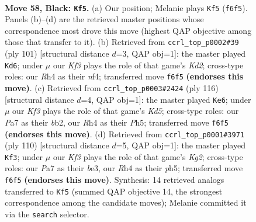 \documentclass[11pt]{article}
\begin{document}
\clearpage

\begin{figure}[p]\centering
\begin{subfigure}{0.46\textwidth}\centering
\resizebox{\linewidth}{!}{%
\newchessgame
\chessboard[
  setfen={8/p2p4/2p2k2/8/7r/8/4K3/8 b - - 3 58},
  showmover=false,
  pgfstyle=straightmove, color=movearrow, markmove={f6-f5}
]}
\caption{}
\end{subfigure}\hfill
\begin{subfigure}{0.46\textwidth}\centering
\resizebox{\linewidth}{!}{%
\newchessgame
\chessboard[
  setfen={8/3k4/5p2/1p6/p2K1N2/8/8/8 b - - 1 51},
  showmover=false,
  pgfstyle=straightmove, color=movearrow, markmove={d7-d6}
]}
\caption{}
\end{subfigure}
\\[4pt]
\begin{subfigure}{0.46\textwidth}\centering
\resizebox{\linewidth}{!}{%
\newchessgame
\chessboard[
  setfen={4k3/8/8/3K2PP/5P2/8/1b6/8 w - - 3 59},
  showmover=false,
  pgfstyle=straightmove, color=movearrow, markmove={d5-e6}
]}
\caption{}
\end{subfigure}\hfill
\begin{subfigure}{0.46\textwidth}\centering
\resizebox{\linewidth}{!}{%
\newchessgame
\chessboard[
  setfen={8/8/8/1P2k2p/P7/4b3/6K1/8 w - - 0 56},
  showmover=false,
  pgfstyle=straightmove, color=movearrow, markmove={g2-f3}
]}
\caption{}
\end{subfigure}
\caption{\textbf{Move 58, Black: \texttt{Kf5}.} (a) Our position; Melanie plays \texttt{Kf5} (\texttt{f6f5}). Panels (b)--(d) are the retrieved master positions whose correspondence most drove this move (highest QAP objective among those that transfer to it). (b) Retrieved from \texttt{ccrl\_top\_p0002\#39} (ply 101) [structural distance $d$=3, QAP obj=1]: the master played \texttt{Kd6}; under $\mu$ our \emph{Kf3} plays the role of that game's \emph{Kd2}; cross-type roles: our \emph{R}h4 as their \emph{n}f4; transferred move \texttt{f6f5} \textbf{(endorses this move)}. (c) Retrieved from \texttt{ccrl\_top\_p0003\#2424} (ply 116) [structural distance $d$=4, QAP obj=1]: the master played \texttt{Ke6}; under $\mu$ our \emph{Kf3} plays the role of that game's \emph{Kd5}; cross-type roles: our \emph{P}a7 as their \emph{b}b2, our \emph{R}h4 as their \emph{P}h5; transferred move \texttt{f6f5} \textbf{(endorses this move)}. (d) Retrieved from \texttt{ccrl\_top\_p0001\#3971} (ply 110) [structural distance $d$=5, QAP obj=1]: the master played \texttt{Kf3}; under $\mu$ our \emph{Kf3} plays the role of that game's \emph{Kg2}; cross-type roles: our \emph{P}a7 as their \emph{b}e3, our \emph{R}h4 as their \emph{p}h5; transferred move \texttt{f6f5} \textbf{(endorses this move)}. Synthesis: 14 retrieved analogs transferred to \texttt{Kf5} (summed QAP objective 14, the strongest correspondence among the candidate moves); Melanie committed it via the \texttt{search} selector.}
\label{fig:thought-m115}
\end{figure}
\end{document}
